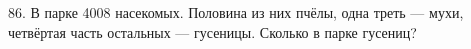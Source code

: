 86. В парке 4008 насекомых. Половина из них пчёлы, одна треть --- мухи, четвёртая часть остальных ---  гусеницы. Сколько в парке гусениц?\\
